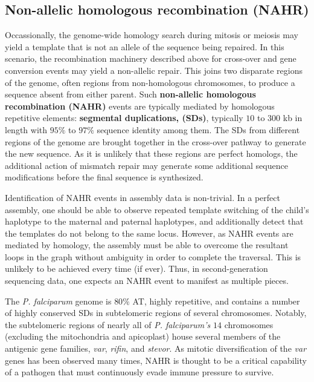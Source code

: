 \subsection{Non-allelic homologous recombination (NAHR)}

Occassionally, the genome-wide homology search during mitosis or meiosis may yield a template that is not an allele of the sequence being repaired.  In this scenario, the recombination machinery described above for cross-over and gene conversion events may yield a non-allelic repair.  This joins two disparate regions of the genome, often regions from non-homologous chromosomes, to produce a sequence absent from either parent.  Such \textbf{non-allelic homologous recombination (NAHR)} events are typically mediated by homologous repetitive elements: \textbf{segmental duplications, (SDs)}, typically $10$ to $300$ kb in length with $95\%$ to $97\%$ sequence identity among them\cite{Gu:2008jl,Sasaki:2010bm,Roehl:2010bt,Parks:2015hj}.  The SDs from different regions of the genome are brought together in the cross-over pathway to generate the new sequence.  As it is unlikely that these regions are perfect homologs, the additional action of mismatch repair may generate some additional sequence modifications before the final sequence is synthesized.

Identification of NAHR events in assembly data is non-trivial.  In a perfect assembly, one should be able to observe repeated template switching of the child's haplotype to the maternal and paternal haplotypes, and additionally detect that the templates do not belong to the same locus.  However, as NAHR events are mediated by homology, the assembly must be able to overcome the resultant loops in the graph without ambiguity in order to complete the traversal.  This is unlikely to be achieved every time (if ever).  Thus, in second-generation sequencing data, one expects an NAHR event to manifest as multiple pieces.

The \textit{P. falciparum} genome is $80\%$ AT, highly repetitive, and contains a number of highly conserved SDs in subtelomeric regions of several chromosomes\cite{Mok:2008ja}.  Notably, the subtelomeric regions of nearly all of \textit{P. falciparum's} $14$ chromosomes (excluding the mitochondria and apicoplast) house several members of the antigenic gene families, \textit{var}, \textit{rifin}, and \textit{stevor}.  As mitotic diversification of the \textit{var} genes has been observed many times, NAHR is thought to be a critical capability of a pathogen that must continuously evade immune pressure to survive.

